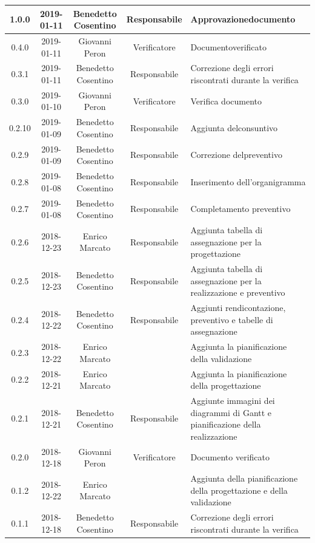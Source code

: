 \documentclass[11pt,a4paper]{article}
\begin{document}
{\begin{tabularx}{\textwidth}{ c | c | c | c | X }
		1.0.0 & 2019-01-11 & Benedetto Cosentino & Responsabile & Approvazione\newline documento\\ \hline
		0.4.0 & 2019-01-11 & Giovanni Peron & Verificatore & Documento\newline verificato\\ \hline
		0.3.1 & 2019-01-11 & Benedetto Cosentino & Responsabile & Correzione degli errori riscontrati durante la verifica \\ \hline
		0.3.0 & 2019-01-10 & Giovanni Peron & Verificatore & Verifica documento\\ \hline
		0.2.10 & 2019-01-09 & Benedetto Cosentino & Responsabile & Aggiunta del\newline consuntivo\\ \hline
		0.2.9 & 2019-01-09 & Benedetto Cosentino & Responsabile & Correzione del\newline preventivo\\ \hline
		0.2.8 & 2019-01-08 & Benedetto Cosentino & Responsabile & Inserimento dell'organigramma \\ \hline
		0.2.7 & 2019-01-08 & Benedetto Cosentino & Responsabile & Completamento preventivo \\ \hline	
		0.2.6 & 2018-12-23 & Enrico Marcato & Responsabile & Aggiunta tabella di assegnazione per la progettazione\\ \hline
		0.2.5 & 2018-12-23 & Benedetto Cosentino & Responsabile & Aggiunta tabella di assegnazione per la realizzazione e preventivo\\ \hline
		0.2.4 & 2018-12-22 & Benedetto Cosentino & Responsabile & Aggiunti rendicontazione, preventivo e tabelle di assegnazione \\ \hline
		0.2.3 & 2018-12-22 & Enrico Marcato &  & Aggiunta la pianificazione della validazione\\ \hline
		0.2.2 & 2018-12-21 & Enrico Marcato &  & Aggiunta la pianificazione della progettazione\\ \hline
		0.2.1 & 2018-12-21 & Benedetto Cosentino & Responsabile & Aggiunte immagini dei diagrammi di Gantt e pianificazione della realizzazione\\ \hline
		0.2.0 & 2018-12-18 & Giovanni Peron & Verificatore & Documento verificato\\ \hline
		0.1.2 & 2018-12-22 & Enrico Marcato &  & Aggiunta della pianificazione della progettazione e della validazione\\ \hline
		0.1.1 & 2018-12-18 & Benedetto Cosentino & Responsabile & Correzione degli errori riscontrati durante la verifica\\ \hline

\end{tabularx}}
\end{document}
